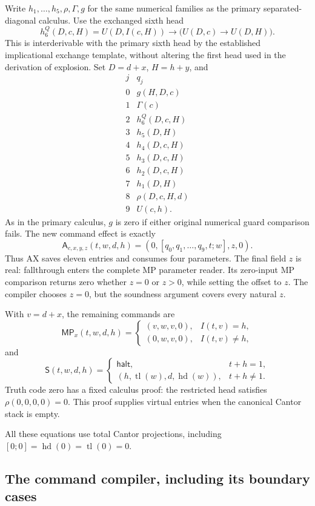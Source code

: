 Write $h_1,\ldots,h_5,\rho,\Gamma,g$ for the same numerical families as
the primary separated-diagonal calculus. Use the exchanged sixth head
\[
 h_6^Q(D,c,H)=U(D,I(c,H))\to\bigl(U(D,c)\to U(D,H)\bigr).
\]
This is interderivable with the primary sixth head by the established
implicational exchange template, without altering the first head used in
the derivation of explosion. Set $D=d+x$, $H=h+y$, and
\[
\begin{array}{c|l}
j&q_j\\\hline
0&g(H,D,c)\\
1&\Gamma(c)\\
2&h_6^Q(D,c,H)\\
3&h_5(D,H)\\
4&h_4(D,c,H)\\
5&h_3(D,c,H)\\
6&h_2(D,c,H)\\
7&h_1(D,H)\\
8&\rho(D,c,H,d)\\
9&U(c,h).
\end{array}
\]
As in the primary calculus, $g$ is zero if either original numerical
guard comparison fails. The new command effect is exactly
\[
 \mathsf A_{c,x,y,z}(t,w,d,h)
       =(0,[q_0,q_1,\ldots,q_9,t;w],z,0).                 \tag{GAX}
\]
Thus AX saves eleven entries and consumes four parameters. The final
field $z$ is real: fallthrough enters the complete MP parameter reader.
Its zero-input MP comparison returns zero whether $z=0$ or $z>0$,
while setting the offset to $z$. The compiler chooses $z=0$, but the
soundness argument covers every natural $z$.

With $v=d+x$, the remaining commands are
\[
 \mathsf{MP}_x(t,w,d,h)=
 \begin{cases}(v,w,v,0),&I(t,v)=h,\\(0,w,v,0),&I(t,v)\ne h,
 \end{cases}
\]
and
\[
 \mathsf S(t,w,d,h)=
 \begin{cases}\mathsf{halt},&t+h=1,\\
 (h,\operatorname{tl}(w),d,\operatorname{hd}(w)),&t+h\ne1.
 \end{cases}
\]
Truth code zero has a fixed calculus proof: the restricted head satisfies
$\rho(0,0,0,0)=0$. This proof supplies virtual entries when the
canonical Cantor stack is empty.

All these equations use total Cantor projections, including
$[0;0]=\operatorname{hd}(0)=\operatorname{tl}(0)=0$.

\subsection{The command compiler, including its boundary cases}

